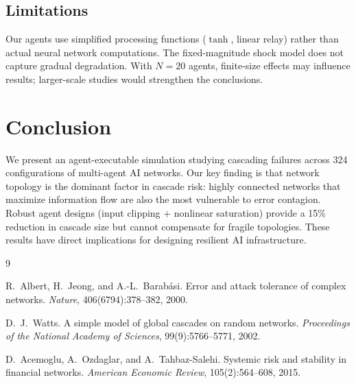 \documentclass[11pt]{article}
\begin{document}
\subsection{Limitations}
Our agents use simplified processing functions ($\tanh$, linear relay) rather than actual neural network computations.
The fixed-magnitude shock model does not capture gradual degradation.
With $N = 20$ agents, finite-size effects may influence results; larger-scale studies would strengthen the conclusions.

\section{Conclusion}

We present an agent-executable simulation studying cascading failures across 324 configurations of multi-agent AI networks.
Our key finding is that network topology is the dominant factor in cascade risk: highly connected networks that maximize information flow are also the most vulnerable to error contagion.
Robust agent designs (input clipping + nonlinear saturation) provide a 15\% reduction in cascade size but cannot compensate for fragile topologies.
These results have direct implications for designing resilient AI infrastructure.


\begin{thebibliography}{9}

R.~Albert, H.~Jeong, and A.-L.~Barab\'{a}si.
\newblock Error and attack tolerance of complex networks.
\newblock \emph{Nature}, 406(6794):378--382, 2000.

D.~J.~Watts.
\newblock A simple model of global cascades on random networks.
\newblock \emph{Proceedings of the National Academy of Sciences}, 99(9):5766--5771, 2002.

D.~Acemoglu, A.~Ozdaglar, and A.~Tahbaz-Salehi.
\newblock Systemic risk and stability in financial networks.
\newblock \emph{American Economic Review}, 105(2):564--608, 2015.

\end{thebibliography}
\end{document}

